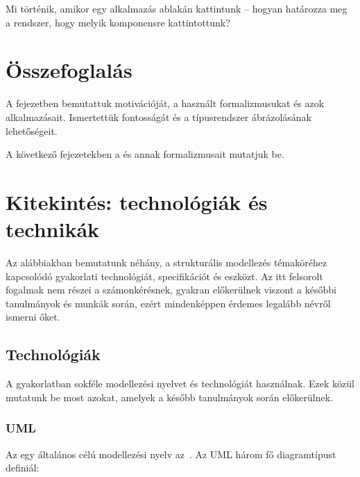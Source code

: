 \begin{feladat}
	Mi történik, amikor egy alkalmazás ablakán kattintunk -- hogyan határozza meg a rendszer, hogy melyik komponensre kattintottunk?
\end{feladat}








\section{Összefoglalás}

A fejezetben bemutattuk  motivációját, a használt formalizmusukat és azok alkalmazásait. Ismertettük  fontosságát és a típusrendszer ábrázolásának lehetőségeit.

A következő fejezetekben a  és annak formalizmusait mutatjuk be.


\section{Kitekintés: technológiák és technikák\kieg}

Az alábbiakban bemutatunk néhány, a strukturális modellezés témaköréhez kapcsolódó gyakorlati technológiát, specifikációt és eszközt. Az itt felsorolt fogalmak nem részei a számonkérésnek, gyakran előkerülnek viszont a későbbi tanulmányok és munkák során, ezért mindenképpen érdemes legalább névről ismerni őket.

\subsection{Technológiák}

A gyakorlatban sokféle modellezési nyelvet és technológiát használnak. Ezek közül mutatunk be most azokat, amelyek a később tanulmányok során előkerülnek.

\subsubsection{UML}

Az  egy általános célú modellezési nyelv az~\cite{UML}. Az UML három fő diagramtípust definiál:

